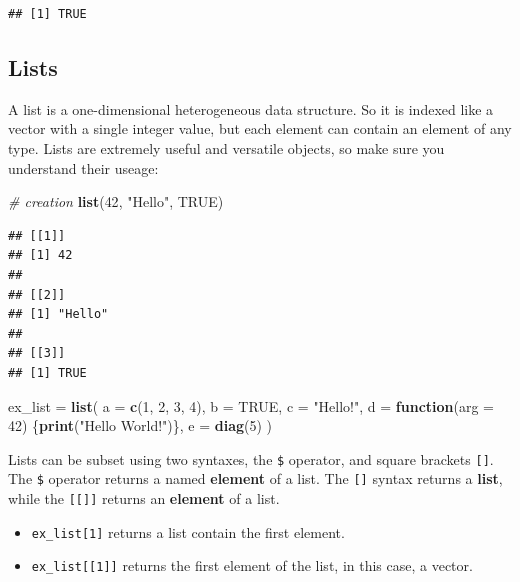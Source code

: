 \documentclass[]{book}
\newenvironment{Shaded}{\begin{snugshade}}{\end{snugshade}}
\newcommand{\KeywordTok}[1]{\textcolor[rgb]{0.13,0.29,0.53}{\textbf{#1}}}
\newcommand{\DataTypeTok}[1]{\textcolor[rgb]{0.13,0.29,0.53}{#1}}
\newcommand{\DecValTok}[1]{\textcolor[rgb]{0.00,0.00,0.81}{#1}}
\newcommand{\StringTok}[1]{\textcolor[rgb]{0.31,0.60,0.02}{#1}}
\newcommand{\CommentTok}[1]{\textcolor[rgb]{0.56,0.35,0.01}{\textit{#1}}}
\newcommand{\OtherTok}[1]{\textcolor[rgb]{0.56,0.35,0.01}{#1}}
\newcommand{\ControlFlowTok}[1]{\textcolor[rgb]{0.13,0.29,0.53}{\textbf{#1}}}
\newcommand{\NormalTok}[1]{#1}
\providecommand{\tightlist}{%
  \setlength{\itemsep}{0pt}\setlength{\parskip}{0pt}}
\theoremstyle{definition}
\theoremstyle{definition}
\theoremstyle{definition}
\theoremstyle{remark}
\begin{document}
\begin{verbatim}
## [1] TRUE
\end{verbatim}

\subsection{Lists}\label{lists}

A list is a one-dimensional heterogeneous data structure. So it is
indexed like a vector with a single integer value, but each element can
contain an element of any type. Lists are extremely useful and versatile
objects, so make sure you understand their useage:

\begin{Shaded}
\begin{Highlighting}[]
\CommentTok{# creation}
\KeywordTok{list}\NormalTok{(}\DecValTok{42}\NormalTok{, }\StringTok{"Hello"}\NormalTok{, }\OtherTok{TRUE}\NormalTok{)}
\end{Highlighting}
\end{Shaded}

\begin{verbatim}
## [[1]]
## [1] 42
## 
## [[2]]
## [1] "Hello"
## 
## [[3]]
## [1] TRUE
\end{verbatim}

\begin{Shaded}
\begin{Highlighting}[]
\NormalTok{ex_list =}\StringTok{ }\KeywordTok{list}\NormalTok{(}
  \DataTypeTok{a =} \KeywordTok{c}\NormalTok{(}\DecValTok{1}\NormalTok{, }\DecValTok{2}\NormalTok{, }\DecValTok{3}\NormalTok{, }\DecValTok{4}\NormalTok{),}
  \DataTypeTok{b =} \OtherTok{TRUE}\NormalTok{,}
  \DataTypeTok{c =} \StringTok{"Hello!"}\NormalTok{,}
  \DataTypeTok{d =} \ControlFlowTok{function}\NormalTok{(}\DataTypeTok{arg =} \DecValTok{42}\NormalTok{) \{}\KeywordTok{print}\NormalTok{(}\StringTok{"Hello World!"}\NormalTok{)\},}
  \DataTypeTok{e =} \KeywordTok{diag}\NormalTok{(}\DecValTok{5}\NormalTok{)}
\NormalTok{)}
\end{Highlighting}
\end{Shaded}

Lists can be subset using two syntaxes, the \texttt{\$} operator, and
square brackets \texttt{{[}{]}}. The \texttt{\$} operator returns a
named \textbf{element} of a list. The \texttt{{[}{]}} syntax returns a
\textbf{list}, while the \texttt{{[}{[}{]}{]}} returns an
\textbf{element} of a list.

\begin{itemize}
\tightlist
\item
  \texttt{ex\_list{[}1{]}} returns a list contain the first element.
\item
  \texttt{ex\_list{[}{[}1{]}{]}} returns the first element of the list,
  in this case, a vector.
\end{itemize}
\end{document}
